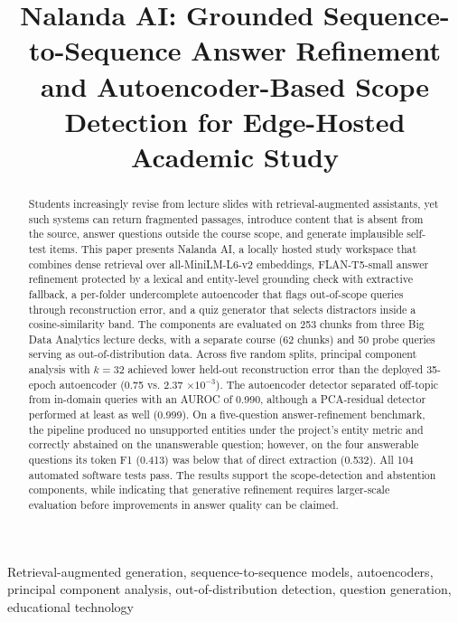 \documentclass[conference]{IEEEtran}
\begin{document}
\title{Nalanda AI: Grounded Sequence-to-Sequence Answer Refinement and Autoencoder-Based Scope Detection for Edge-Hosted Academic Study}
\author{
\and
{}
}
\maketitle
\begin{abstract}Students increasingly revise from lecture slides with retrieval-augmented assistants, yet such systems can return fragmented passages, introduce content that is absent from the source, answer questions outside the course scope, and generate implausible self-test items. This paper presents Nalanda AI, a locally hosted study workspace that combines dense retrieval over all-MiniLM-L6-v2 embeddings, FLAN-T5-small answer refinement protected by a lexical and entity-level grounding check with extractive fallback, a per-folder undercomplete autoencoder that flags out-of-scope queries through reconstruction error, and a quiz generator that selects distractors inside a cosine-similarity band. The components are evaluated on 253 chunks from three Big Data Analytics lecture decks, with a separate course (62 chunks) and 50 probe queries serving as out-of-distribution data. Across five random splits, principal component analysis with $k=32$ achieved lower held-out reconstruction error than the deployed 35-epoch autoencoder (0.75 vs. 2.37 $\times 10^{-3}$). The autoencoder detector separated off-topic from in-domain queries with an AUROC of 0.990, although a PCA-residual detector performed at least as well (0.999). On a five-question answer-refinement benchmark, the pipeline produced no unsupported entities under the project's entity metric and correctly abstained on the unanswerable question; however, on the four answerable questions its token F1 (0.413) was below that of direct extraction (0.532). All 104 automated software tests pass. The results support the scope-detection and abstention components, while indicating that generative refinement requires larger-scale evaluation before improvements in answer quality can be claimed.\end{abstract}
\begin{IEEEkeywords}Retrieval-augmented generation, sequence-to-sequence models, autoencoders, principal component analysis, out-of-distribution detection, question generation, educational technology\end{IEEEkeywords}
\end{document}
